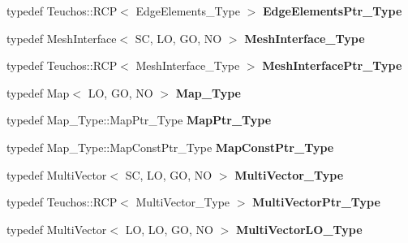 \begin{DoxyCompactItemize}
typedef Teuchos\+::\+R\+CP$<$ Edge\+Elements\+\_\+\+Type $>$ {\bfseries Edge\+Elements\+Ptr\+\_\+\+Type}
\item 
\mbox{\label{classFEDD_1_1AdaptiveMeshRefinement_a00302cf977be058f72385dd6687344cb}} 
typedef Mesh\+Interface$<$ SC, LO, GO, NO $>$ {\bfseries Mesh\+Interface\+\_\+\+Type}
\item 
\mbox{\label{classFEDD_1_1AdaptiveMeshRefinement_ab247d74ce40f3b9ca72334ed61052cf6}} 
typedef Teuchos\+::\+R\+CP$<$ Mesh\+Interface\+\_\+\+Type $>$ {\bfseries Mesh\+Interface\+Ptr\+\_\+\+Type}
\item 
\mbox{\label{classFEDD_1_1AdaptiveMeshRefinement_a3c51bc6fe3a5ab13cd4e4fb44bff78c9}} 
typedef Map$<$ LO, GO, NO $>$ {\bfseries Map\+\_\+\+Type}
\item 
\mbox{\label{classFEDD_1_1AdaptiveMeshRefinement_a56971c3f5c10a56a42c694676f52d3c1}} 
typedef Map\+\_\+\+Type\+::\+Map\+Ptr\+\_\+\+Type {\bfseries Map\+Ptr\+\_\+\+Type}
\item 
\mbox{\label{classFEDD_1_1AdaptiveMeshRefinement_acc2c8e7ecacdf0992be92861366de188}} 
typedef Map\+\_\+\+Type\+::\+Map\+Const\+Ptr\+\_\+\+Type {\bfseries Map\+Const\+Ptr\+\_\+\+Type}
\item 
\mbox{\label{classFEDD_1_1AdaptiveMeshRefinement_ae656c560626c10f5fc6722f43e4281fc}} 
typedef Multi\+Vector$<$ SC, LO, GO, NO $>$ {\bfseries Multi\+Vector\+\_\+\+Type}
\item 
\mbox{\label{classFEDD_1_1AdaptiveMeshRefinement_ae422943f76cfe9ada609671de16eb9c8}} 
typedef Teuchos\+::\+R\+CP$<$ Multi\+Vector\+\_\+\+Type $>$ {\bfseries Multi\+Vector\+Ptr\+\_\+\+Type}
\item 
\mbox{\label{classFEDD_1_1AdaptiveMeshRefinement_adad31caec4b769abf8658c67001f977b}} 
typedef Multi\+Vector$<$ LO, LO, GO, NO $>$ {\bfseries Multi\+Vector\+L\+O\+\_\+\+Type}
\item 
\mbox{\label{classFEDD_1_1AdaptiveMeshRefinement_a9d82d2ea10ef7ec6d16da19105a29a57}} 

\end{DoxyCompactItemize}
